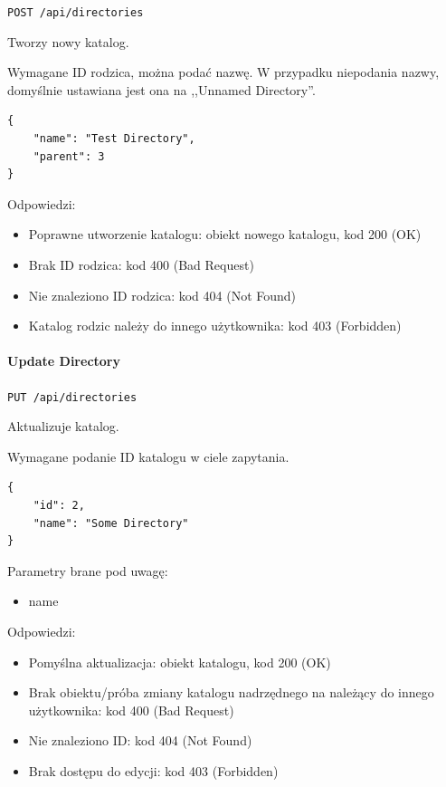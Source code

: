 \documentclass[a4paper,twoside,12pt]{book}
\begin{document}
\texttt{POST /api/directories}

Tworzy nowy katalog.

Wymagane ID rodzica, można podać nazwę. W przypadku niepodania nazwy, domyślnie ustawiana jest ona na ,,Unnamed Directory''.

\begin{verbatim}
{
    "name": "Test Directory",
    "parent": 3
}
\end{verbatim}

Odpowiedzi: 
\begin{itemize}
	\item Poprawne utworzenie katalogu: obiekt nowego katalogu, kod 200 (OK) 
	\item Brak ID rodzica: kod 400 (Bad Request)
	\item Nie znaleziono ID rodzica: kod 404 (Not Found) 
	\item Katalog rodzic należy do innego użytkownika: kod 403 (Forbidden)
\end{itemize}

\paragraph{Update Directory}\label{update-directory}

\texttt{PUT /api/directories}

Aktualizuje katalog.

Wymagane podanie ID katalogu w ciele zapytania.

\begin{verbatim}
{
    "id": 2,
    "name": "Some Directory"
}
\end{verbatim}

Parametry brane pod uwagę: 
\begin{itemize}
	\item  name
\end{itemize}

Odpowiedzi: 
\begin{itemize}
	\item Pomyślna aktualizacja: obiekt katalogu, kod 200 (OK)
	\item Brak obiektu/próba zmiany katalogu nadrzędnego na należący do innego użytkownika: kod 400 (Bad Request) 
	\item Nie znaleziono ID: kod 404 (Not Found) 
	\item Brak dostępu do edycji: kod 403 (Forbidden)
\end{itemize}
\end{document}
